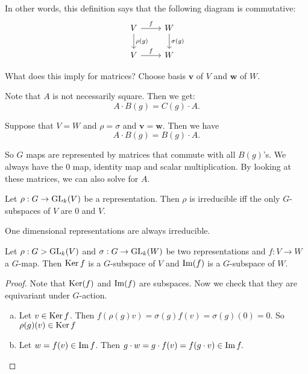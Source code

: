 In other words, this definition says that the following diagram is commutative:
\[
    \begin{tikzcd}
        V \arrow[r, "f"] \arrow[d, "\rho(g)"]& W \arrow[d, "\sigma(g)"]\\
        V \arrow[r, "f"] & W
    \end{tikzcd}
\]


What does this imply for matrices?
Choose basis $\mathbf{v}$ of $V$ and  $\mathbf{w}$ of  $W$.


Note that $A$ is not necessarily square.
Then we get:
\[
    A \cdot  B(g) = C(g) \cdot A
.\] 

Suppose that $V = W$ and  $\rho = \sigma$ and  $\mathbf{v} = \mathbf{w}$.
Then we have
\[
    A \cdot B(g) = B(g)\cdot  A
.\] 

So $G$ maps are represented by matrices that commute with all $B(g)$'s.
We always have the $0$ map,  identity map and scalar multiplication.
By looking at these matrices, we can also solve for $A$.


\begin{definition}
    Let $\rho: G \to  \operatorname{GL}_k(V)$ be a representation.
    Then $\rho$ is irreducible iff the only $G$-subspaces of $V$ are $0$ and $V$.
\end{definition}
\begin{eg}
    One dimensional representations are always irreducible.
\end{eg}

\begin{prop}[2.7]
    Let $\rho: G > \operatorname{GL}_k(V)$ and  $\sigma: G \to  \operatorname{GL}_{k}(W)$ be two representations and $f: V \to  W$ a $G$-map.
    Then $\operatorname{Ker} f$ is a $G$-subspace of  $V$ and $\operatorname{Im}(f)$ is a $G$-subspace of $W$.
\end{prop}
\begin{proof}
    Note that $\operatorname{Ker}(f)$ and  $\operatorname{Im}(f)$ are subspaces.
    Now we check that they are equivariant under $G$-action.

    \begin{enumerate}[(a)]
        \item Let $v \in \operatorname{Ker} f$.
            Then $ f(\rho(g) v) = \sigma(g) f(v) = \sigma(g)(0) = 0 .$ 
            So $\rho(g)(v) \in \operatorname{Ker} f$
        \item Let $w  = f(v) \in \operatorname{Im} f$.
            Then $ g\cdot w = g \cdot  f(v) = f (g\cdot v) \in \operatorname{Im} f
            .$ 
    \end{enumerate}
\end{proof}


